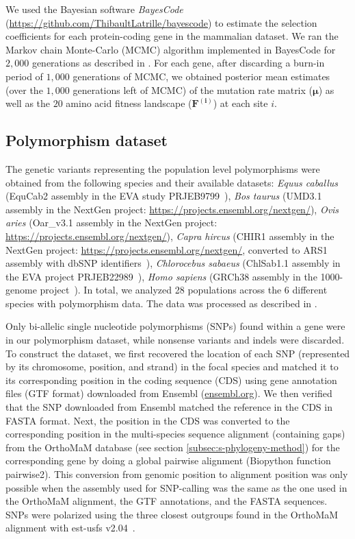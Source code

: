 \documentclass{article}
\newcommand{\UniDimArray}[1]{\bm{#1}}
\begin{document}
    We used the Bayesian software \textit{BayesCode} (\url{https://github.com/ThibaultLatrille/bayescode}) to estimate the selection coefficients for each protein-coding gene in the mammalian dataset.
    We ran the Markov chain Monte-Carlo (MCMC) algorithm implemented in BayesCode for $2,000$ generations as described in \textcite{latrille_genes_2023}.
    For each gene, after discarding a burn-in period of $1,000$ generations of MCMC, we obtained posterior mean estimates (over the $1,000$ generations left of MCMC) of the mutation rate matrix ($\UniDimArray{\mu}$) as well as the $20$ amino acid fitness landscape ($\UniDimArray{F^{(i)}}$) at each site $i$.

    \subsection{Polymorphism dataset}
    \label{subsec:polymorphism-dataset}

    The genetic variants representing the population level polymorphisms were obtained from the following species and their available datasets: \textit{Equus caballus} (EquCab2 assembly in the EVA study PRJEB9799~\cite{alabri_whole_2020}), \textit{Bos taurus} (UMD3.1 assembly in the NextGen project: \url{https://projects.ensembl.org/nextgen/}), \textit{Ovis aries} (Oar\_v3.1 assembly in the NextGen project: \url{https://projects.ensembl.org/nextgen/}), \textit{Capra hircus} (CHIR1 assembly in the NextGen project: \url{https://projects.ensembl.org/nextgen/}, converted to ARS1 assembly with dbSNP identifiers~\cite{sherry_dbsnp_2001}), \textit{Chlorocebus sabaeus} (ChlSab1.1 assembly in the EVA project PRJEB22989~\cite{svardal_ancient_2017}), \textit{Homo sapiens} (GRCh38 assembly in the 1000-genome project~\cite{zheng-bradley_alignment_2017}).
    In total, we analyzed 28 populations across the 6 different species with polymorphism data.
    The data was processed as described in \textcite{latrille_genes_2023}.

    Only bi-allelic single nucleotide polymorphisms (SNPs) found within a gene were in our polymorphism dataset, while nonsense variants and indels were discarded.
    To construct the dataset, we first recovered the location of each SNP (represented by its chromosome, position, and strand) in the focal species and matched it to its corresponding position in the coding sequence (CDS) using gene annotation files (GTF format) downloaded from Ensembl (\url{ensembl.org}).
    We then verified that the SNP downloaded from Ensembl matched the reference in the CDS in FASTA format.
    Next, the position in the CDS was converted to the corresponding position in the multi-species sequence alignment (containing gaps) from the OrthoMaM database (see section \ref{subsec:s-phylogeny-method}) for the corresponding gene by doing a global pairwise alignment (Biopython function pairwise2).
    This conversion from genomic position to alignment position was only possible when the assembly used for SNP-calling was the same as the one used in the OrthoMaM alignment, the GTF annotations, and the FASTA sequences.
    SNPs were polarized using the three closest outgroups found in the OrthoMaM alignment with est-usfs v2.04~\cite{keightley_inferring_2018}.
\end{document}
